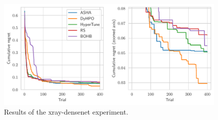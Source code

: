 \begin{figure}[H]
    \centering
    \includegraphics[scale=0.65]{img/real_exp/xray_densenet_regret_plot.pdf}
    \caption{Results of the xray-densenet experiment.}
    \label{fig:xray_densenet}
\end{figure}
